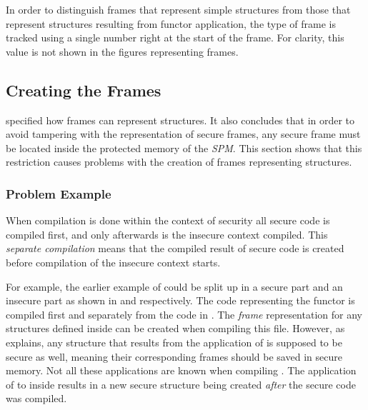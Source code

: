 In order to distinguish frames that represent simple structures from those that represent structures resulting from functor application, the type of frame is tracked using a single number right at the start of the frame.
For clarity, this value is not shown in the figures representing frames.

\subsection{Creating the Frames}
 specified how frames can represent structures.
It also concludes that in order to avoid tampering with the representation of secure frames, any secure frame must be located inside the protected memory of the \emph{SPM}.
This section shows that this restriction causes problems with the creation of frames representing structures.

\subsubsection{Problem Example}
When compilation is done within the context of security all secure code is compiled first, and only afterwards is the insecure context compiled.
This \emph{separate compilation} means that the compiled result of secure code is created before compilation of the insecure context starts.

For example, the earlier example of  could be split up in a secure part and an insecure part as shown in  and  respectively.
The code representing the functor is compiled first and separately from the code in . 
The \emph{frame} representation for any structures defined inside  can be created when compiling this file.
However, as  explains, any structure that results from the application of  is supposed to be secure as well, meaning their corresponding frames should be saved in secure memory. 
Not all these applications are known when compiling .
The application of  to  inside  results in a new secure structure being created \emph{after} the secure code was compiled.

